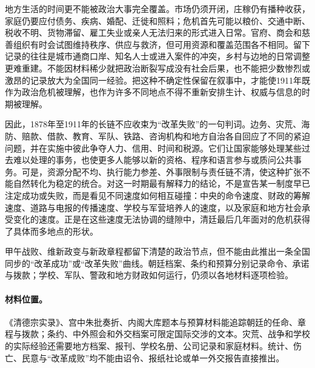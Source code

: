 地方生活的时间更不能被政治大事完全覆盖。市场仍须开闭，庄稼仍有播种收获，家庭仍要应付债务、疾病、婚配、迁徙和照料；危机首先可能以粮价、交通中断、税收不明、货物滞留、雇工失业或亲人无法归来的形式进入日常。官府、商会和慈善组织有时会试图维持秩序、供应与救济，但可用资源和覆盖范围各不相同。留下记录的往往是城市通商口岸、知名人士或进入案件的冲突，乡村与边地的日常调整更难重建。不能因材料稀少就把政治断裂写成没有社会后果，也不能把少数惨烈或激昂的记录放大为全国同一经验。把这种不确定性保留在叙事中，才能使1911年既作为政治危机被理解，也作为许多不同地点不得不重新安排生计、权威与信息的时期被理解。

因此，1878年至1911年的长链不应收束为“改革失败”的一句判词。边务、灾荒、海防、赔款、借款、教育、军队、铁路、咨询机构和地方自治各自回应了不同的紧迫问题，并在实施中彼此争夺人力、信用、时间和税源。它们让国家能够处理某些过去难以处理的事务，也使更多人能够以新的资格、程序和语言参与或质问公共事务。可是，资源分配不均、执行能力参差、外事限制与责任链不清，使这种扩张不能自然转化为稳定的统合。对这一时期最有解释力的结论，不是宣告某一制度早已注定成功或失败，而是看见不同速度如何相互碰撞：中央的命令速度、财政的筹解速度、道路与电报的传播速度、学校与军营培养人的速度，以及家庭和地方社会承受变化的速度。正是在这些速度无法协调的缝隙中，清廷最后几年面对的危机获得了具体而多地点的形状。

\begin{debate}
甲午战败、维新政变与新政章程都留下清楚的政治节点，但不能由此推出一条全国同步的“改革成功”或“改革失败”曲线。朝廷档案、条约和预算分别记录命令、承诺与拨款；学校、军队、警政和地方财政如何运行，仍须以各地材料逐项检验。
\end{debate}

\paragraph{材料位置。} 《清德宗实录》、宫中朱批奏折、内阁大库题本与预算材料能追踪朝廷的任命、章程与拨款；条约、中外照会和外交档案可限定国际交涉的文本。灾荒、战争和学校的实际经验还需要地方档案、报刊、学校名册、公司记录和家庭材料。统计、伤亡、民意与“改革成败”均不能由诏令、报纸社论或单一外交报告直接推出。



